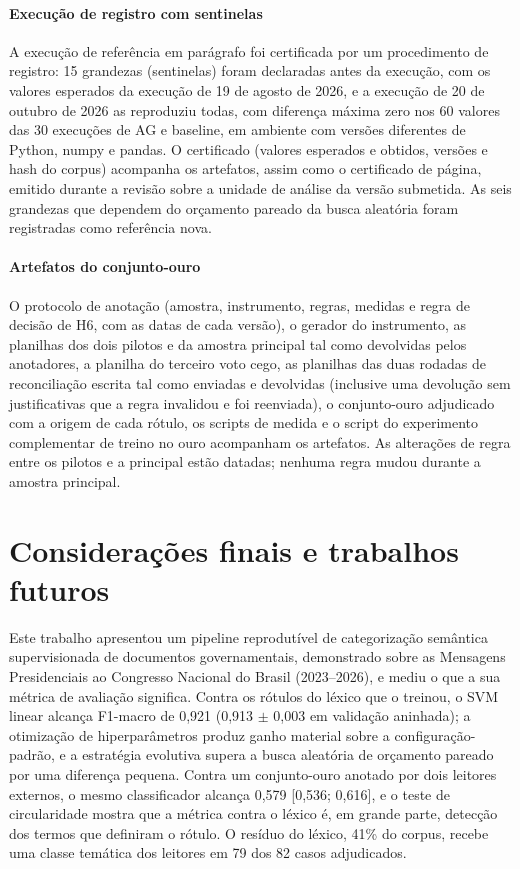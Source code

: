 \documentclass[fleqn,10pt]{SelfArx}
\begin{document}
\paragraph{Execução de registro com sentinelas} A execução de referência em parágrafo foi certificada por um procedimento de registro: 15 grandezas (sentinelas) foram declaradas antes da execução, com os valores esperados da execução de 19 de agosto de 2026, e a execução de 20 de outubro de 2026 as reproduziu todas, com diferença máxima zero nos 60 valores das 30 execuções de AG e baseline, em ambiente com versões diferentes de Python, numpy e pandas. O certificado (valores esperados e obtidos, versões e hash do corpus) acompanha os artefatos, assim como o certificado de página, emitido durante a revisão sobre a unidade de análise da versão submetida. As seis grandezas que dependem do orçamento pareado da busca aleatória foram registradas como referência nova.

\paragraph{Artefatos do conjunto-ouro} O protocolo de anotação (amostra, instrumento, regras, medidas e regra de decisão de H6, com as datas de cada versão), o gerador do instrumento, as planilhas dos dois pilotos e da amostra principal tal como devolvidas pelos anotadores, a planilha do terceiro voto cego, as planilhas das duas rodadas de reconciliação escrita tal como enviadas e devolvidas (inclusive uma devolução sem justificativas que a regra invalidou e foi reenviada), o conjunto-ouro adjudicado com a origem de cada rótulo, os scripts de medida e o script do experimento complementar de treino no ouro acompanham os artefatos. As alterações de regra entre os pilotos e a principal estão datadas; nenhuma regra mudou durante a amostra principal.

\section{Considerações finais e trabalhos futuros}
\label{sec:conclusao}

Este trabalho apresentou um pipeline reprodutível de categorização semântica supervisionada de documentos governamentais, demonstrado sobre as Mensagens Presidenciais ao Congresso Nacional do Brasil (2023--2026), e mediu o que a sua métrica de avaliação significa. Contra os rótulos do léxico que o treinou, o SVM linear alcança F1-macro de 0,921 (0,913 $\pm$ 0,003 em validação aninhada); a otimização de hiperparâmetros produz ganho material sobre a configuração-padrão, e a estratégia evolutiva supera a busca aleatória de orçamento pareado por uma diferença pequena. Contra um conjunto-ouro anotado por dois leitores externos, o mesmo classificador alcança 0,579 [0,536; 0,616], e o teste de circularidade mostra que a métrica contra o léxico é, em grande parte, detecção dos termos que definiram o rótulo. O resíduo do léxico, 41\% do corpus, recebe uma classe temática dos leitores em 79 dos 82 casos adjudicados.
\end{document}
